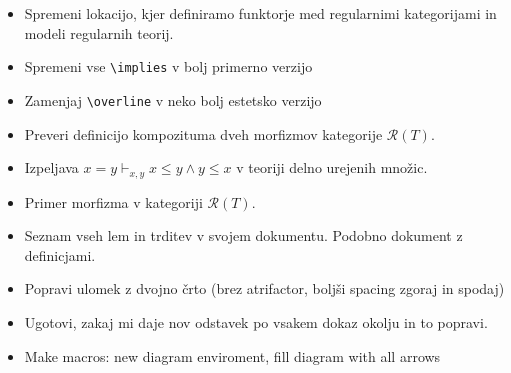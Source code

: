 \documentclass[a4paper]{article}
\begin{document}
    \begin{itemize}
        \item Spremeni lokacijo, kjer definiramo funktorje med regularnimi kategorijami in modeli regularnih teorij.
        \item Spremeni vse \verb|\implies| v bolj primerno verzijo
        \item Zamenjaj \verb|\overline| v neko bolj estetsko verzijo
        \item Preveri definicijo kompozituma dveh morfizmov kategorije $\mathcal{R}(T)$.
        \item Izpeljava $x = y \vdash_{x,y} x \leq y \wedge y \leq x$ v teoriji delno urejenih množic.
        \item Primer morfizma v kategoriji $\mathcal{R}(T)$.
        \item Seznam vseh lem in trditev v svojem dokumentu. Podobno dokument z definicjami.
        \item Popravi ulomek z dvojno črto (brez atrifactor, boljši spacing zgoraj in spodaj)
        \item Ugotovi, zakaj mi daje nov odstavek po vsakem dokaz okolju in to popravi.
        \item Make macros: new diagram enviroment, fill diagram with all arrows
    \end{itemize}
\end{document}

